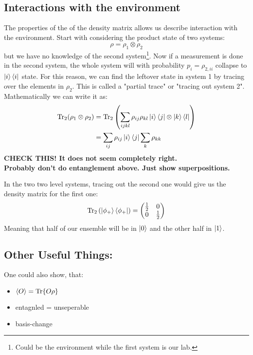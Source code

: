 \subsection{Interactions with the environment}
The properties of the of the density matrix allows us describe interaction with the environment. Start with considering the product state of two systems:
\begin{equation}
    \rho = \rho_1 \otimes \rho_2
\end{equation}
but we have no knowledge of the second system\footnote{Could be the environment while the first system is our lab.}. Now if a measurement is done in the second system, the whole system will with probability $p_i = \rho_{2, ii}$ collapse to $\ket{i}\bra{i}$ state. For this reason, we can find the leftover state in system 1 by tracing over the elements in $\rho_2$. This is called a "partial trace" or "tracing out system 2". Mathematically we can write it as:
\begin{align}
    \Tr_2 (\rho_1 \otimes \rho_2) &= \Tr_2 \left(\sum_{ijkl} \rho_{ij}\rho_{kl} \ket{i}\bra{j} \otimes \ket{k}\bra{l}\right) \nonumber \\
    &= \sum_{ij} \rho_{ij} \ket{i}\bra{j} \sum_k \rho_{kk} 
\end{align}
\textbf{CHECK THIS! It does not seem completely right.} \\


\textbf{Probably don't do entanglement above. Just show superpositions. }

In the two two level systems, tracing out the second one would give us the density matrix for the first one:
\begin{equation}
    \Tr_2 \left(\ket{\phi_+}\bra{\phi_+}\right) = \begin{pmatrix}
        \frac12 & 0 \\
        0       & \frac12
    \end{pmatrix}
\end{equation}
Meaning that half of our ensemble will be in $\ket{0}$ and the other half in $\ket{1}$.

\subsection{Other Useful Things:}
One could also show, that:
\begin{itemize}
    \item $\expval{O} = \Tr{O\rho}$
    \item entagnled = unseperable
    \item basis-change
\end{itemize}

